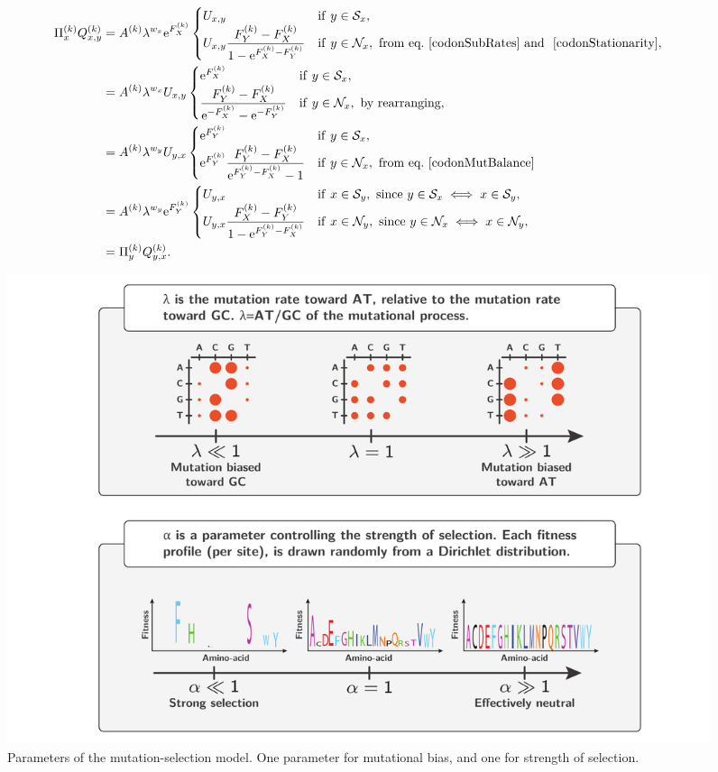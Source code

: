 \begin{align}
\Pi_x^{(k)} Q_{x, y}^{(k)}
& =A^{(k)} \lambda^{w_x} \e^{F_X^{(k)}}
\begin{cases}
U_{x, y}
& \mathrm{if} \ y \in \NxSyn,  \\
U_{x, y} \dfrac{F_Y^{(k)} - F_X^{(k)}}{1 - \e^{F_X^{(k)} - F_Y^{(k)}}}
& \mathrm{if}  \ y \in \NxNonSyn, \ \textrm{from eq.}\ \ref{codonSubRates} \text{ and } \ \ref{codonStationarity},
\end{cases} \\
& =A^{(k)} \lambda^{w_x} U_{x, y}
\begin{cases}
\e^{F_X^{(k)}}
& \mathrm{if} \ y \in \NxSyn,  \\
\dfrac{F_Y^{(k)} - F_X^{(k)}}{ \e^{-F_X^{(k)}}  - \e^{- F_Y^{(k)}} }
& \mathrm{if}  \ y \in \NxNonSyn, \ \textrm{by rearranging},
\end{cases} \\
& =A^{(k)} \lambda^{w_y} U_{y, x}
\begin{cases}
\e^{F_Y^{(k)}}
& \mathrm{if} \ y \in \NxSyn , \\
\e^{F_Y^{(k)}} \dfrac{F_Y^{(k)} - F_X^{(k)}}{ \e^{F_Y^{(k)}-F_X^{(k)}} - 1 }
& \mathrm{if}  \ y \in \NxNonSyn, \ \textrm{from eq.} \ \ref{codonMutBalance}
\end{cases} \\
& =A^{(k)} \lambda^{w_y} \e^{F_Y^{(k)}}
\begin{cases}
U_{y, x}
& \mathrm{if} \ x \in \NySyn, \ \textrm{since} \ y \in \NxSyn \iff x \in \NySyn,  \\
U_{y, x} \dfrac{F_X^{(k)} - F_Y^{(k)}}{1 - \e^{F_Y^{(k)}-F_X^{(k)}}}
& \mathrm{if}  \ x \in \NyNonSyn, \ \textrm{since} \ y \in \NxNonSyn \iff x \in \NyNonSyn,
\end{cases} \\
& =\Pi_y^{(k)} Q_{y, x}^{(k)} .
\label{codonSubBalance}
\end{align}

\begin{figure}[thbp]
	\begin{center}
		\includegraphics[width=\textwidth] {figures/mut-bias-parameters}
	\end{center}
	\caption[Parameters of the mutation-selection model]{Parameters of the mutation-selection model. One parameter for mutational bias, and one for strength of selection.}
\end{figure}

